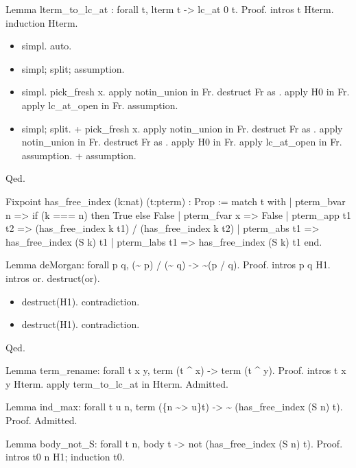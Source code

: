 Lemma lterm\_to\_lc\_at : forall t, lterm t -> lc\_at 0 t.
Proof.
  intros t Hterm.
  induction Hterm.

\begin{itemize}
\item  simpl.
    auto.

\item  simpl; split; assumption.

\item  simpl.
    pick\_fresh x.
    apply notin\_union in Fr.
    destruct Fr as  .
    apply H0 in Fr.
    apply lc\_at\_open in Fr.
    assumption.

\item  simpl; split.
    + pick\_fresh x.
    apply notin\_union in Fr.
    destruct Fr as  .
    apply notin\_union in Fr.
    destruct Fr as  .
    apply H0 in Fr.
    apply lc\_at\_open in Fr.
    assumption.
    + assumption.

\end{itemize}
Qed.




Fixpoint has\_free\_index (k:nat) (t:pterm) : Prop :=
  match t with
    | pterm\_bvar n => if (k === n) then True else False
    | pterm\_fvar x => False
    | pterm\_app t1 t2 => (has\_free\_index k t1) / (has\_free\_index k t2)
    | pterm\_abs t1 => has\_free\_index (S k) t1
    | pterm\_labs t1 => has\_free\_index (S k) t1
  end.


Lemma deMorgan: forall p q, (\~{} p) / (\~{} q) -> \~{}(p / q).
Proof.
  intros p q H1.
  intros or.
  destruct(or).

\begin{itemize}
\item  destruct(H1).
    contradiction.

\item  destruct(H1).
    contradiction.

\end{itemize}
Qed.


Lemma term\_rename: forall t x y, term (t \^{} x) -> term (t \^{} y).
Proof.
  intros t x y Hterm.
  apply term\_to\_lc\_at in Hterm.
  Admitted.




Lemma ind\_max: forall t u n, term (\{n \~{}> u\}t) -> \~{} (has\_free\_index (S n) t).
Proof.
Admitted.


Lemma body\_not\_S: forall t n, body t -> not (has\_free\_index (S n) t).
Proof.
  intros t0 n H1; induction t0.

